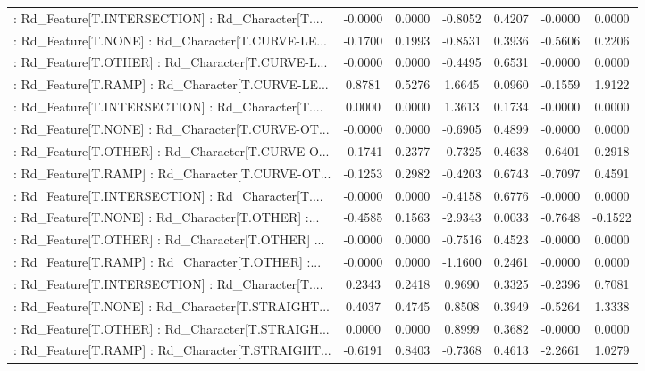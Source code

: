 \begin{longtable}{p{4cm}cccccc}
 : Rd\_Feature[T.INTERSECTION] : Rd\_Character[T.... & -0.0000 &    0.0000 & -0.8052 &       0.4207 & -0.0000 &  0.0000 \\
 : Rd\_Feature[T.NONE] : Rd\_Character[T.CURVE-LE... & -0.1700 &    0.1993 & -0.8531 &       0.3936 & -0.5606 &  0.2206 \\
 : Rd\_Feature[T.OTHER] : Rd\_Character[T.CURVE-L... & -0.0000 &    0.0000 & -0.4495 &       0.6531 & -0.0000 &  0.0000 \\
 : Rd\_Feature[T.RAMP] : Rd\_Character[T.CURVE-LE... &  0.8781 &    0.5276 &  1.6645 &       0.0960 & -0.1559 &  1.9122 \\
 : Rd\_Feature[T.INTERSECTION] : Rd\_Character[T.... &  0.0000 &    0.0000 &  1.3613 &       0.1734 & -0.0000 &  0.0000 \\
 : Rd\_Feature[T.NONE] : Rd\_Character[T.CURVE-OT... & -0.0000 &    0.0000 & -0.6905 &       0.4899 & -0.0000 &  0.0000 \\
 : Rd\_Feature[T.OTHER] : Rd\_Character[T.CURVE-O... & -0.1741 &    0.2377 & -0.7325 &       0.4638 & -0.6401 &  0.2918 \\
 : Rd\_Feature[T.RAMP] : Rd\_Character[T.CURVE-OT... & -0.1253 &    0.2982 & -0.4203 &       0.6743 & -0.7097 &  0.4591 \\
 : Rd\_Feature[T.INTERSECTION] : Rd\_Character[T.... & -0.0000 &    0.0000 & -0.4158 &       0.6776 & -0.0000 &  0.0000 \\
 : Rd\_Feature[T.NONE] : Rd\_Character[T.OTHER] :... & -0.4585 &    0.1563 & -2.9343 &       0.0033 & -0.7648 & -0.1522 \\
 : Rd\_Feature[T.OTHER] : Rd\_Character[T.OTHER] ... & -0.0000 &    0.0000 & -0.7516 &       0.4523 & -0.0000 &  0.0000 \\
 : Rd\_Feature[T.RAMP] : Rd\_Character[T.OTHER] :... & -0.0000 &    0.0000 & -1.1600 &       0.2461 & -0.0000 &  0.0000 \\
 : Rd\_Feature[T.INTERSECTION] : Rd\_Character[T.... &  0.2343 &    0.2418 &  0.9690 &       0.3325 & -0.2396 &  0.7081 \\
 : Rd\_Feature[T.NONE] : Rd\_Character[T.STRAIGHT... &  0.4037 &    0.4745 &  0.8508 &       0.3949 & -0.5264 &  1.3338 \\
 : Rd\_Feature[T.OTHER] : Rd\_Character[T.STRAIGH... &  0.0000 &    0.0000 &  0.8999 &       0.3682 & -0.0000 &  0.0000 \\
 : Rd\_Feature[T.RAMP] : Rd\_Character[T.STRAIGHT... & -0.6191 &    0.8403 & -0.7368 &       0.4613 & -2.2661 &  1.0279 \\

\end{longtable}
